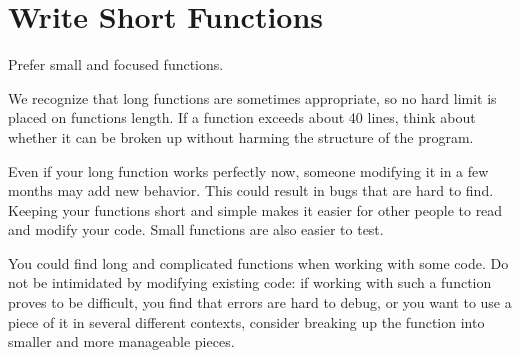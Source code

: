 
\section{Write Short Functions}\label{sec:write-short-functions}
Prefer small and focused functions.

We recognize that long functions are sometimes appropriate, so no hard limit is placed on functions length. If a function exceeds about 40 lines, think about whether it can be broken up without harming the structure of the program.

Even if your long function works perfectly now, someone modifying it in a few months may add new behavior. This could result in bugs that are hard to find. Keeping your functions short and simple makes it easier for other people to read and modify your code. Small functions are also easier to test.

You could find long and complicated functions when working with some code. Do not be intimidated by modifying existing code: if working with such a function proves to be difficult, you find that errors are hard to debug, or you want to use a piece of it in several different contexts, consider breaking up the function into smaller and more manageable pieces.
